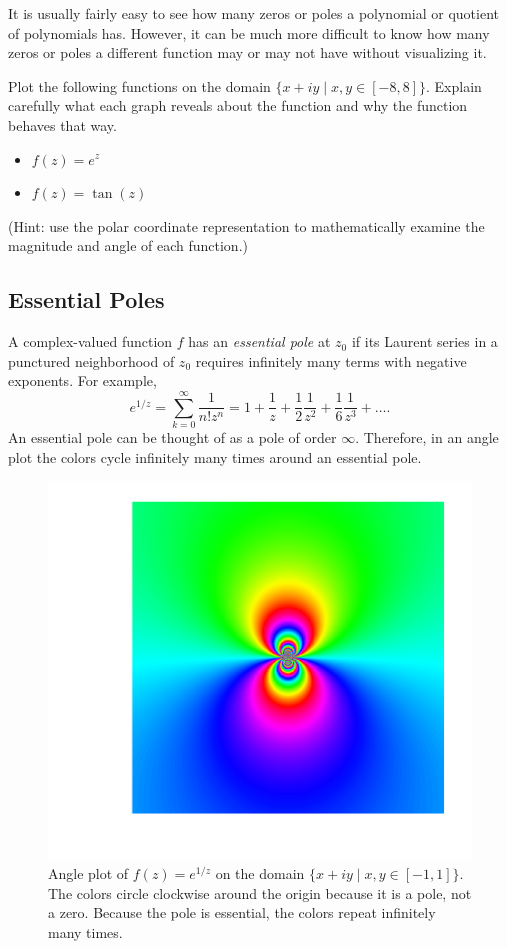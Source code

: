 It is usually fairly easy to see how many zeros or poles a polynomial or quotient of polynomials has.
However, it can be much more difficult to know how many zeros or poles a different function may or may not have without visualizing it.

\begin{problem}
\label{prob:findpz}
Plot the following functions on the domain $\{x+iy\mid x,y\in[-8,8]\}$.
Explain carefully what each graph reveals about the function and why the function behaves that way.
\begin{itemize}
\item $f(z) = e^z$
\item $f(z) = \tan(z)$
\end{itemize}
(Hint: use the polar coordinate representation to mathematically examine the magnitude and angle of each function.)
\end{problem}

\subsection*{Essential Poles} %

A complex-valued function $f$ has an \emph{essential pole} at $z_0$ if its Laurent series in a punctured neighborhood of $z_0$ requires infinitely many terms with negative exponents.
For example,
\[
e^{1/z} = \sum_{k=0}^{\infty}\frac{1}{n! z^n} = 1+\frac{1}{z}+\frac{1}{2}\frac{1}{z^2}+\frac{1}{6}\frac{1}{z^3}+\ldots.
\]
An essential pole can be thought of as a pole of order $\infty$.
Therefore, in an angle plot the colors cycle infinitely many times around an essential pole.

\begin{figure}[H] %
\includegraphics[width=.7\textwidth]{figures/poles_angle.png}
\caption{Angle plot of $f(z) = e^{1/z}$ on the domain $\{x+iy \mid x,y \in [-1,1]\}$.
The colors circle clockwise around the origin because it is a pole, not a zero.
Because the pole is essential, the colors repeat infinitely many times.}
\label{fig:complex-essential-pole}
\end{figure}

